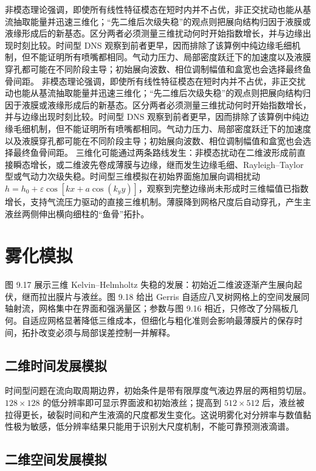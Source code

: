 \documentclass[11pt,a4paper,openany,fontset=none]{ctexbook}
\begin{document}
非模态理论强调，即使所有线性特征模态在短时内并不占优，非正交扰动也能从基流抽取能量并迅速三维化；“先二维后次级失稳”的观点则把展向结构归因于液膜或液缘形成后的新基态。区分两者必须测量三维扰动何时开始指数增长，并与边缘出现时刻比较。时间型 DNS 观察到前者更早，因而排除了该算例中纯边缘毛细机制，但不能证明所有喷嘴都相同。气动力压力、局部密度跃迁下的加速度以及液膜穿孔都可能在不同阶段主导；初始展向波数、相位调制幅值和盒宽也会选择最终鱼骨间距。
非模态理论强调，即使所有线性特征模态在短时内并不占优，非正交扰动也能从基流抽取能量并迅速三维化；“先二维后次级失稳”的观点则把展向结构归因于液膜或液缘形成后的新基态。区分两者必须测量三维扰动何时开始指数增长，并与边缘出现时刻比较。时间型 DNS 观察到前者更早，因而排除了该算例中纯边缘毛细机制，但不能证明所有喷嘴都相同。气动力压力、局部密度跃迁下的加速度以及液膜穿孔都可能在不同阶段主导；初始展向波数、相位调制幅值和盒宽也会选择最终鱼骨间距。
三维化可能通过两条路线发生：非模态扰动在二维波形成前直接瞬态增长，或二维波先卷成薄膜与边缘，继而发生边缘毛细、Rayleigh--Taylor 型或气动力次级失稳。时间型三维模拟在初始界面施加展向调相扰动 $h=h_0+\varepsilon\cos[kx+a\cos(k_yy)]$，观察到完整边缘尚未形成时三维幅值已指数增长，支持气流压力驱动的直接三维机制。薄膜降到网格尺度后自动穿孔，产生主液丝两侧伸出横向细柱的“鱼骨”拓扑。
\section{雾化模拟}

图 9.17 展示三维 Kelvin--Helmholtz 失稳的发展：初始近二维波逐渐产生展向起伏，继而拉出膜片与液丝。图 9.18 给出 Gerris 自适应八叉树网格上的空间发展同轴射流，网格集中在界面和强涡量区；参数与图 9.16 相近，只修改了分隔板几何。自适应网格显著降低三维成本，但细化与粗化准则会影响最薄膜片的保存时间，拓扑改变必须与局部误差控制一并解释。
\subsection{二维时间发展模拟}

时间型问题在流向取周期边界，初始条件是带有限厚度气液边界层的两相剪切层。$128\times128$ 的低分辨率即可显示界面波和初始液丝；提高到 $512\times512$ 后，液丝被拉得更长，破裂时间和产生液滴的尺度都发生变化。这说明雾化对分辨率与数值黏性极为敏感，低分辨率结果只能用于识别大尺度机制，不能可靠预测液滴谱。

\subsection{二维空间发展模拟}
\end{document}
